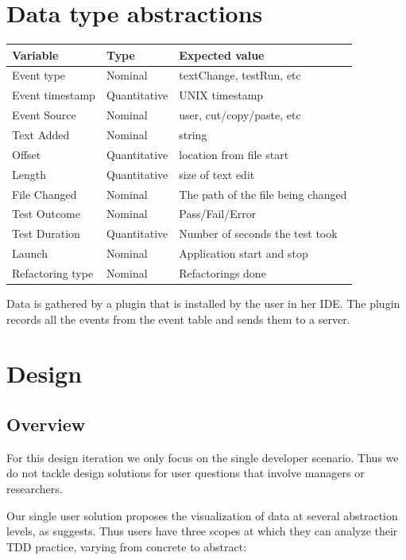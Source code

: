 \documentclass[journal]{vgtc}                %
\begin{document}
\section{Data type abstractions}
\label{sec:data}

\begin{table}[hbt]
\begin{tabular}{l l l}
\toprule
Variable & Type & Expected value \\
\midrule
Event type & Nominal & textChange, testRun, etc \\
Event timestamp & Quantitative & UNIX timestamp \\
Event Source & Nominal & user, cut/copy/paste, etc \\
Text Added & Nominal & string \\
Offset & Quantitative & location from file start \\
Length & Quantitative & size of text edit \\
File Changed & Nominal & The path of the file being changed \\
Test Outcome & Nominal & Pass/Fail/Error \\
Test Duration & Quantitative & Number of seconds the test took \\
Launch & Nominal & Application start and stop \\
Refactoring type & Nominal & Refactorings done \\
\bottomrule
\end{tabular}
\end{table}

Data is gathered by a plugin that is installed by the user in her IDE. The plugin records all the events from the event table and sends them to a server.

\section{Design}

\subsection{Overview}

For this design iteration we only focus on the single developer scenario. Thus we do not tackle design solutions for user questions that involve managers or researchers.

Our single user solution proposes the visualization of data at several abstraction levels, as \cite{two} suggests. Thus users have three scopes at which they can analyze their TDD practice, varying from concrete to abstract:
\end{document}
